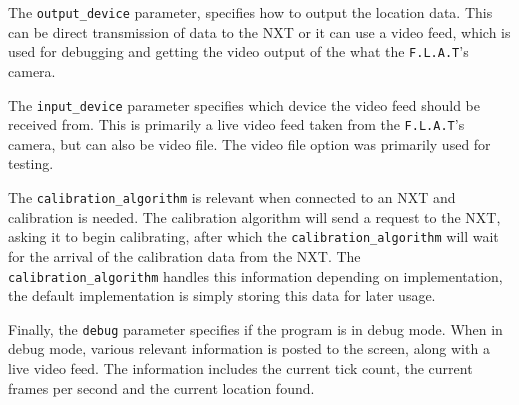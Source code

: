 The \texttt{output\_device} parameter, specifies how to output the location data.
This can be direct transmission of data to the NXT or it can use a video feed, which is used for debugging and getting the video output of the  what the \texttt{F.L.A.T}'s camera.

The \texttt{input\_device} parameter specifies which device the video feed should be received from. 
This is primarily a live video feed taken from the \texttt{F.L.A.T}'s camera, but can also be video file.
The video file option was primarily used for testing.

The \texttt{calibration\_algorithm} is relevant when connected to an NXT and calibration is needed. 
The calibration algorithm will send a request to the NXT, asking it to begin calibrating, after which the \texttt{calibration\_algorithm} will wait for the arrival of the calibration data from the NXT. 
The \texttt{calibration\_algorithm} handles this information depending on implementation, the default implementation is simply storing this data for later usage.

Finally, the \texttt{debug} parameter specifies if the program is in debug mode.
When in debug mode, various relevant information is posted to the screen, along with a live video feed.
The information includes the current tick count, the current frames per second and the current location found.

